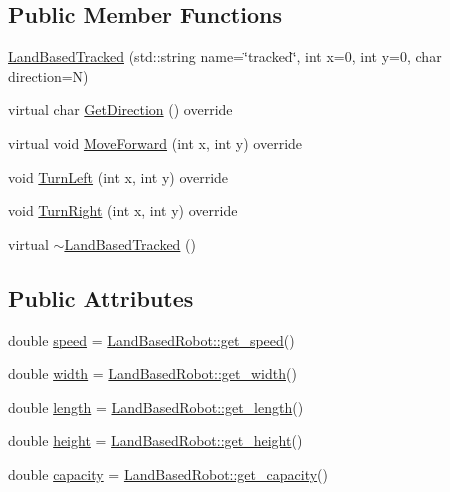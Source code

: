 \subsection*{Public Member Functions}
\begin{DoxyCompactItemize}
\item 
\hyperlink{classfp_1_1_land_based_tracked_adde9b81138a39b13b4b05386c1a6b3a3}{Land\+Based\+Tracked} (std\+::string name=\char`\"{}tracked\char`\"{}, int x=0, int y=0, char direction=\textquotesingle{}N\textquotesingle{})
\item 
virtual char \hyperlink{classfp_1_1_land_based_tracked_a3e6ba37a5c5bf8f2b4abb19907e5e9b8}{Get\+Direction} () override
\item 
virtual void \hyperlink{classfp_1_1_land_based_tracked_a02145c5c1642c961f9c0cca1a4cf1b70}{Move\+Forward} (int x, int y) override
\item 
void \hyperlink{classfp_1_1_land_based_tracked_a2b106dbbb108cb97f212ed661e8d244b}{Turn\+Left} (int x, int y) override
\item 
void \hyperlink{classfp_1_1_land_based_tracked_a00cc1731e59096f3fe490f108ebc7012}{Turn\+Right} (int x, int y) override
\item 
virtual \hyperlink{classfp_1_1_land_based_tracked_a60b4e1da43f053a5a0351d52d79785e0}{$\sim$\+Land\+Based\+Tracked} ()
\end{DoxyCompactItemize}
\subsection*{Public Attributes}
\begin{DoxyCompactItemize}
\item 
double \hyperlink{classfp_1_1_land_based_tracked_a08b67f2f7c1da6db1c4d6cf4de689573}{speed} = \hyperlink{classfp_1_1_land_based_robot_a44fed3a00505f6679ff8505aebae4505}{Land\+Based\+Robot\+::get\+\_\+speed}()
\item 
double \hyperlink{classfp_1_1_land_based_tracked_a82b74ecf56d8d84b001fcb4f1ae92dad}{width} = \hyperlink{classfp_1_1_land_based_robot_a523b439167030a7ab1e0e7f6c8d42315}{Land\+Based\+Robot\+::get\+\_\+width}()
\item 
double \hyperlink{classfp_1_1_land_based_tracked_a5c81a68468defb336f0c207069290cc2}{length} = \hyperlink{classfp_1_1_land_based_robot_adb03fbded9a3b0553301bcc0322cb1c1}{Land\+Based\+Robot\+::get\+\_\+length}()
\item 
double \hyperlink{classfp_1_1_land_based_tracked_a23bbcb88d1b14513c786017dc1ceee66}{height} = \hyperlink{classfp_1_1_land_based_robot_ac77253c989c417ee26654541c50669d4}{Land\+Based\+Robot\+::get\+\_\+height}()
\item 
double \hyperlink{classfp_1_1_land_based_tracked_a13d92f0fa31949ca268678a7c339d4f7}{capacity} = \hyperlink{classfp_1_1_land_based_robot_a24c0f6d395f3dfd6bdbcf5a2a9801de1}{Land\+Based\+Robot\+::get\+\_\+capacity}()
\end{DoxyCompactItemize}
